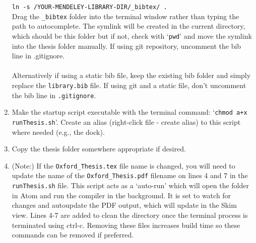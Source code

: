 \begin{enumerate}
  \texttt{ln -s /YOUR-MENDELEY-LIBRARY-DIR/\_bibtex/ .}\\
  Drag the \texttt{\_bibtex} folder into the terminal window rather than typing the path to autocomplete. The symlink will be created in the current directory, which should be this folder but if not, check with `\texttt{pwd}' and move the symlink into the thesis folder manually.
  If using git repository, uncomment the bib line in .gitignore.\\
  \\
  Alternatively if using a static bib file, keep the existing bib folder and simply replace the \texttt{library.bib} file. If using git and a static file, don't uncomment the bib line in \texttt{.gitignore}.
  \item Make the startup script executable with the terminal command: `\texttt{chmod a+x runThesis.sh}'. Create an alias (right-click file - create alias) to this script where needed (e.g., the dock).
  \item Copy the thesis folder somewhere appropriate if desired.
  \item (Note:) If the \verb|Oxford_Thesis.tex| file name is changed, you will need to update the name of the \verb|Oxford_Thesis.pdf| filename on lines 4 and 7 in the \texttt{runThesis.sh} file. This script acts as a `auto-run' which will open the folder in Atom and run the compiler in the background. It is set to watch for changes and autoupdate the PDF output, which will update in the Skim view. Lines 4-7 are added to clean the directory once the terminal process is terminated using ctrl-c. Removing these files increases build time so these commands can be removed if preferred.
\end{enumerate}

